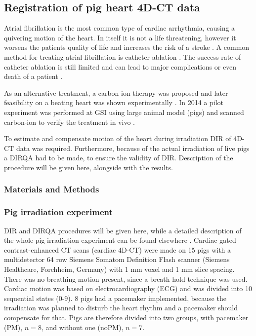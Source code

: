 \newpage
\subsection{Registration of pig heart 4D-CT data}

Atrial fibrillation is the most common type of cardiac arrhythmia, causing a quivering motion of the heart. 
In itself it is not a life threatening, however it worsens the patients quality of life and increases the risk of a stroke \cite{Benjamin1998}. 
A common method for treating atrial fibrillation is catheter ablation \cite{January2014}. The success rate of catheter ablation is still limited and 
can lead to major complications or even death of a patient \cite{Cappato2005,Cappato2010}.

As an alternative treatment, a carbon-ion therapy was proposed \cite{Bert2012} and later feasibility on a beating heart was shown experimentally \cite{Lehmann2015b}. In 2014 a pilot experiment was performed at GSI using large animal model (pigs) and
scanned carbon-ion to verify the treatment in vivo \cite{Lehmann2015}.

To estimate and compensate motion of the heart during irradiation DIR of 4D-CT data was required. Furthermore, because of the actual irradiation of live pigs a DIRQA had to be made, to ensure the validity of DIR. Description of the procedure will be given here,
alongside with the results.


\subsubsection{Materials and Methods}


\subsubsection{Pig irradiation experiment}

DIR and DIRQA procedures will be given here, while a detailed description of the whole pig irradiation experiment can be found elsewhere \cite{Lehmann2015}. Cardiac gated contrast-enhanced CT scans (cardiac 4D-CT) were made on 15 pigs with a multidetector 64 row Siemens Somatom Definition Flash scanner 
(Siemens Healthcare, Forchheim, Germany) with 1 mm voxel and 1 mm slice spacing. There was no breathing motion present, since a breath-hold technique was used. Cardiac motion was based on electrocardiography (ECG)
and was divided into 10 sequential states (0-9). 
8 pigs had a pacemaker implemented, because the irradiation was planned to disturb the heart rhythm and a pacemaker should compensate for that. Pigs are therefore divided into two groups, with pacemaker (PM), $n=8$, and without one (noPM), $n=7$.

